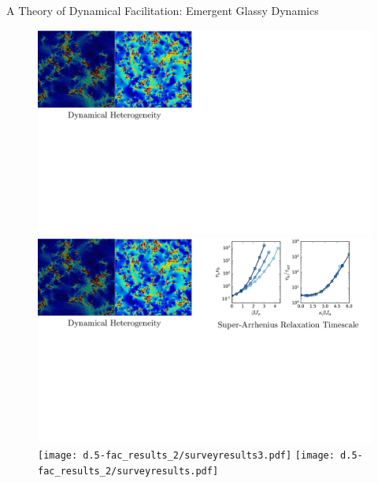 \begin{frame}{A Theory of Dynamical Facilitation: Emergent Glassy Dynamics}\label{d.5}
\begin{figure}
\begin{overprint}
    \centering\includegraphics[width=0.85\linewidth]{d.5-fac_results_2/surveyresults1.pdf}
    \centering\includegraphics[width=0.85\linewidth]{d.5-fac_results_2/surveyresults2.pdf}
    \centering\texttt{[image: d.5-fac\_results\_2/surveyresults3.pdf]}
    \centering\texttt{[image: d.5-fac\_results\_2/surveyresults.pdf]}

\end{overprint}
\end{figure}    
\end{frame}
